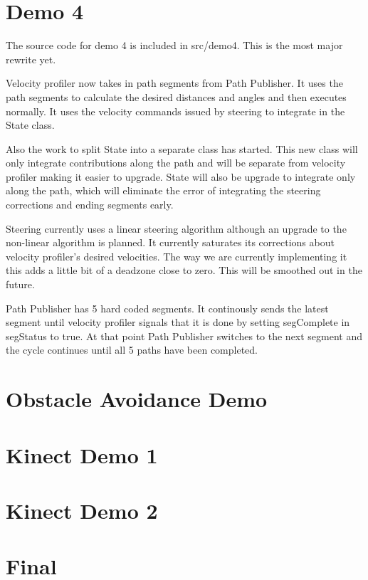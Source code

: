 \section{Demo 4}
The source code for demo 4 is included in src/demo4.  This is the most
major rewrite yet.

Velocity profiler now takes in path segments from Path Publisher.  It
uses the path segments to calculate the desired distances and angles
and then executes normally. It uses the velocity commands issued by
steering to integrate in the State class.

Also the work to split State into a separate class has started.  This
new class will only integrate contributions along the path and will be
separate from velocity profiler making it easier to upgrade.  State
will also be upgrade to integrate only along the path, which will
eliminate the error of integrating the steering corrections and ending
segments early.

Steering currently uses a linear steering algorithm although an
upgrade to the non-linear algorithm is planned.  It currently
saturates its corrections about velocity profiler's desired
velocities.  The way we are currently implementing it this adds a
little bit of a deadzone close to zero.  This will be smoothed out in
the future.

Path Publisher has 5 hard coded segments.  It continously sends the
latest segment until velocity profiler signals that it is done by
setting segComplete in segStatus to true.  At that point Path
Publisher switches to the next segment and the cycle continues until
all 5 paths have been completed.


\section{Obstacle Avoidance Demo}

\section{Kinect Demo 1}

\section{Kinect  Demo 2}

\section{Final}
